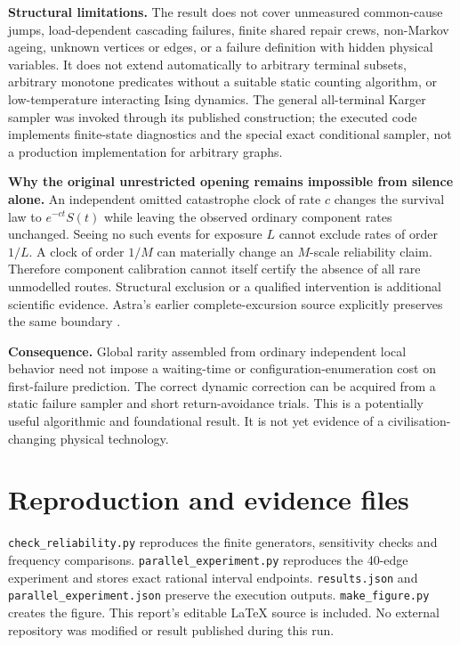 \documentclass[11pt,a4paper]{article}
\begin{document}
\textbf{Structural limitations.} The result does not cover unmeasured common-cause jumps, load-dependent cascading failures, finite shared repair crews, non-Markov ageing, unknown vertices or edges, or a failure definition with hidden physical variables. It does not extend automatically to arbitrary terminal subsets, arbitrary monotone predicates without a suitable static counting algorithm, or low-temperature interacting Ising dynamics. The general all-terminal Karger sampler was invoked through its published construction; the executed code implements finite-state diagnostics and the special exact conditional sampler, not a production implementation for arbitrary graphs.

\textbf{Why the original unrestricted opening remains impossible from silence alone.} An independent omitted catastrophe clock of rate $c$ changes the survival law to $e^{-ct}S(t)$ while leaving the observed ordinary component rates unchanged. Seeing no such events for exposure $L$ cannot exclude rates of order $1/L$. A clock of order $1/M$ can materially change an $M$-scale reliability claim. Therefore component calibration cannot itself certify the absence of all rare unmodelled routes. Structural exclusion or a qualified intervention is additional scientific evidence. Astra's earlier complete-excursion source explicitly preserves the same boundary \cite{astra}.

\textbf{Consequence.} Global rarity assembled from ordinary independent local behavior need not impose a waiting-time or configuration-enumeration cost on first-failure prediction. The correct dynamic correction can be acquired from a static failure sampler and short return-avoidance trials. This is a potentially useful algorithmic and foundational result. It is not yet evidence of a civilisation-changing physical technology.

\section*{Reproduction and evidence files}
\texttt{check\_reliability.py} reproduces the finite generators, sensitivity checks and frequency comparisons. \texttt{parallel\_experiment.py} reproduces the 40-edge experiment and stores exact rational interval endpoints. \texttt{results.json} and \texttt{parallel\_experiment.json} preserve the execution outputs. \texttt{make\_figure.py} creates the figure. This report's editable LaTeX source is included. No external repository was modified or result published during this run.
\end{document}
